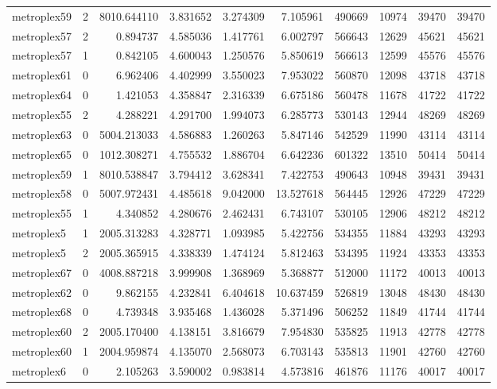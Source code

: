 \begin{longtable}{|l|r|r|r|r|r|r|r|r|r|}
metroplex59 & 2 & 8010.644110 & 3.831652 & 3.274309 & 7.105961 & 490669 & 10974 & 39470 & 39470 \\
metroplex57 & 2 & 0.894737 & 4.585036 & 1.417761 & 6.002797 & 566643 & 12629 & 45621 & 45621 \\
metroplex57 & 1 & 0.842105 & 4.600043 & 1.250576 & 5.850619 & 566613 & 12599 & 45576 & 45576 \\
metroplex61 & 0 & 6.962406 & 4.402999 & 3.550023 & 7.953022 & 560870 & 12098 & 43718 & 43718 \\
metroplex64 & 0 & 1.421053 & 4.358847 & 2.316339 & 6.675186 & 560478 & 11678 & 41722 & 41722 \\
metroplex55 & 2 & 4.288221 & 4.291700 & 1.994073 & 6.285773 & 530143 & 12944 & 48269 & 48269 \\
metroplex63 & 0 & 5004.213033 & 4.586883 & 1.260263 & 5.847146 & 542529 & 11990 & 43114 & 43114 \\
metroplex65 & 0 & 1012.308271 & 4.755532 & 1.886704 & 6.642236 & 601322 & 13510 & 50414 & 50414 \\
metroplex59 & 1 & 8010.538847 & 3.794412 & 3.628341 & 7.422753 & 490643 & 10948 & 39431 & 39431 \\
metroplex58 & 0 & 5007.972431 & 4.485618 & 9.042000 & 13.527618 & 564445 & 12926 & 47229 & 47229 \\
metroplex55 & 1 & 4.340852 & 4.280676 & 2.462431 & 6.743107 & 530105 & 12906 & 48212 & 48212 \\
metroplex5 & 1 & 2005.313283 & 4.328771 & 1.093985 & 5.422756 & 534355 & 11884 & 43293 & 43293 \\
metroplex5 & 2 & 2005.365915 & 4.338339 & 1.474124 & 5.812463 & 534395 & 11924 & 43353 & 43353 \\
metroplex67 & 0 & 4008.887218 & 3.999908 & 1.368969 & 5.368877 & 512000 & 11172 & 40013 & 40013 \\
metroplex62 & 0 & 9.862155 & 4.232841 & 6.404618 & 10.637459 & 526819 & 13048 & 48430 & 48430 \\
metroplex68 & 0 & 4.739348 & 3.935468 & 1.436028 & 5.371496 & 506252 & 11849 & 41744 & 41744 \\
metroplex60 & 2 & 2005.170400 & 4.138151 & 3.816679 & 7.954830 & 535825 & 11913 & 42778 & 42778 \\
metroplex60 & 1 & 2004.959874 & 4.135070 & 2.568073 & 6.703143 & 535813 & 11901 & 42760 & 42760 \\
metroplex6 & 0 & 2.105263 & 3.590002 & 0.983814 & 4.573816 & 461876 & 11176 & 40017 & 40017 \\

\end{longtable}
